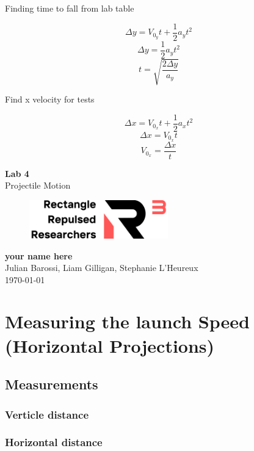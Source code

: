 \documentclass[11pt, letterpaper, includehead]{article}
\begin{document}
Finding time to fall from lab table

$$\Delta y = V_{0_y}t + \frac{1}{2}a_yt^2$$
$$\Delta y = \frac{1}{2}a_yt^2$$
$$t = \sqrt{\frac{2\Delta y}{a_y}}$$


Find x velocity for tests

$$\Delta x = V_{0_x}t + \frac{1}{2}a_xt^2$$
$$\Delta x = V_{0_x}t$$
$$V_{0_x} = \frac{\Delta x}{t}$$

\begin{titlepage}
  \begin{center}
    \Huge{\textbf{Lab 4}}\\
    \Huge{Projectile Motion}
    \vfill
    \begin{figure}[H] %
      \centering 
      \includegraphics[width=6cm]{../logo.png}
    \end{figure}
    \large{\textbf{your name here}}\\
    \large{Julian Barossi, Liam Gilligan, Stephanie L'Heureux}\\
    \vspace{0.5cm}
    \normalsize
    \today
  \end{center}
\end{titlepage}

\tableofcontents
\pagebreak %

\pagestyle{fancy}
\fancyhead{}

\section{Measuring the launch Speed (Horizontal Projections)} %
\subsection{Measurements} %
\subsubsection{Verticle distance} %
\subsubsection{Horizontal distance} %
\end{document}
